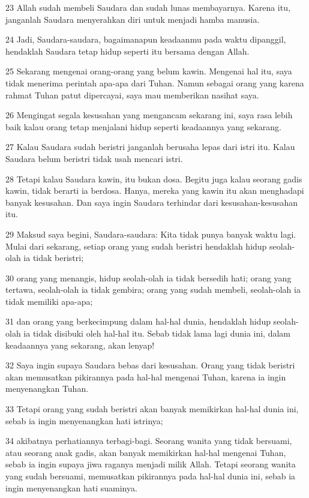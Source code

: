 \par 23 Allah sudah membeli Saudara dan sudah lunas membayarnya. Karena itu, janganlah Saudara menyerahkan diri untuk menjadi hamba manusia.
\par 24 Jadi, Saudara-saudara, bagaimanapun keadaanmu pada waktu dipanggil, hendaklah Saudara tetap hidup seperti itu bersama dengan Allah.
\par 25 Sekarang mengenai orang-orang yang belum kawin. Mengenai hal itu, saya tidak menerima perintah apa-apa dari Tuhan. Namun sebagai orang yang karena rahmat Tuhan patut dipercayai, saya mau memberikan nasihat saya.
\par 26 Mengingat segala kesusahan yang mengancam sekarang ini, saya rasa lebih baik kalau orang tetap menjalani hidup seperti keadaannya yang sekarang.
\par 27 Kalau Saudara sudah beristri janganlah berusaha lepas dari istri itu. Kalau Saudara belum beristri tidak usah mencari istri.
\par 28 Tetapi kalau Saudara kawin, itu bukan dosa. Begitu juga kalau seorang gadis kawin, tidak berarti ia berdosa. Hanya, mereka yang kawin itu akan menghadapi banyak kesusahan. Dan saya ingin Saudara terhindar dari kesusahan-kesusahan itu.
\par 29 Maksud saya begini, Saudara-saudara: Kita tidak punya banyak waktu lagi. Mulai dari sekarang, setiap orang yang sudah beristri hendaklah hidup seolah-olah ia tidak beristri;
\par 30 orang yang menangis, hidup seolah-olah ia tidak bersedih hati; orang yang tertawa, seolah-olah ia tidak gembira; orang yang sudah membeli, seolah-olah ia tidak memiliki apa-apa;
\par 31 dan orang yang berkecimpung dalam hal-hal dunia, hendaklah hidup seolah-olah ia tidak disibuki oleh hal-hal itu. Sebab tidak lama lagi dunia ini, dalam keadaannya yang sekarang, akan lenyap!
\par 32 Saya ingin supaya Saudara bebas dari kesusahan. Orang yang tidak beristri akan memusatkan pikirannya pada hal-hal mengenai Tuhan, karena ia ingin menyenangkan Tuhan.
\par 33 Tetapi orang yang sudah beristri akan banyak memikirkan hal-hal dunia ini, sebab ia ingin menyenangkan hati istrinya;
\par 34 akibatnya perhatiannya terbagi-bagi. Seorang wanita yang tidak bersuami, atau seorang anak gadis, akan banyak memikirkan hal-hal mengenai Tuhan, sebab ia ingin supaya jiwa raganya menjadi milik Allah. Tetapi seorang wanita yang sudah bersuami, memusatkan pikirannya pada hal-hal dunia ini, sebab ia ingin menyenangkan hati suaminya.

